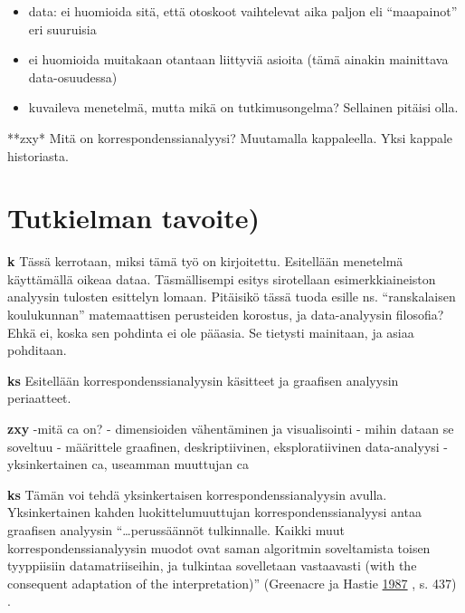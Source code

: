 \documentclass[
  finnish,
]{book}
\begin{document}
\begin{itemize}
\item
  data: ei huomioida sitä, että otoskoot vaihtelevat aika paljon eli
  ``maapainot'' eri suuruisia
\item
  ei huomioida muitakaan otantaan liittyviä asioita (tämä ainakin
  mainittava data-osuudessa)
\item
  kuvaileva menetelmä, mutta mikä on tutkimusongelma? Sellainen pitäisi
  olla.
\end{itemize}

**zxy* Mitä on korrespondenssianalyysi? Muutamalla kappaleella. Yksi
kappale historiasta.

\hypertarget{tutkielman-tavoite}{%
\section{Tutkielman tavoite)}\label{tutkielman-tavoite}}

\textbf{k} Tässä kerrotaan, miksi tämä työ on kirjoitettu. Esitellään
menetelmä käyttämällä oikeaa dataa. Täsmällisempi esitys sirotellaan
esimerkkiaineiston analyysin tulosten esittelyn lomaan. Pitäisikö tässä
tuoda esille ns. ``ranskalaisen koulukunnan'' matemaattisen perusteiden
korostus, ja data-analyysin filosofia? Ehkä ei, koska sen pohdinta ei
ole pääasia. Se tietysti mainitaan, ja asiaa pohditaan.

\textbf{ks} Esitellään korrespondenssianalyysin käsitteet ja graafisen
analyysin periaatteet.

\textbf{zxy} -mitä ca on? - dimensioiden vähentäminen ja visualisointi -
mihin dataan se soveltuu - määrittele graafinen, deskriptiivinen,
eksploratiivinen data-analyysi - yksinkertainen ca, useamman muuttujan
ca

\textbf{ks} Tämän voi tehdä yksinkertaisen korrespondenssianalyysin
avulla. Yksinkertainen kahden luokittelumuuttujan
korrespondenssianalyysi antaa graafisen analyysin ``\ldots perussäännöt
tulkinnalle. Kaikki muut korrespondenssianalyysin muodot ovat saman
algoritmin soveltamista toisen tyyppiisiin datamatriiseihin, ja
tulkintaa sovelletaan vastaavasti (with the consequent adaptation of the
interpretation)'' (Greenacre ja Hastie
\protect\hyperlink{ref-RefWorks:doc:5a857a44e4b0ed2d44664d84}{1987} , s.
437) .
\end{document}

